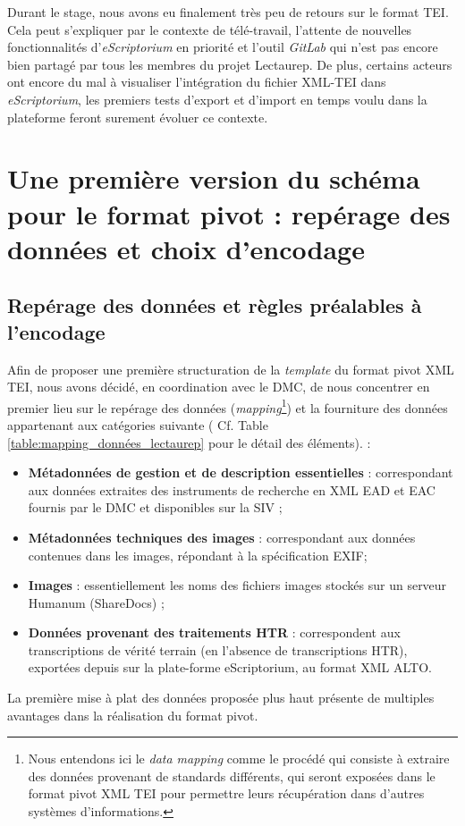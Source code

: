 Durant le stage, nous avons eu finalement très peu de retours sur le format TEI. Cela peut s'expliquer par le contexte de télé-travail, l'attente de nouvelles fonctionnalités d'\textit{eScriptorium} en priorité et l'outil \textit{GitLab} qui n'est pas encore bien partagé par tous les membres du projet Lectaurep. De plus, certains acteurs ont encore du mal à visualiser l'intégration du fichier XML-TEI dans \textit{eScriptorium}, les premiers tests d'export et d'import en temps voulu dans la plateforme feront surement évoluer ce contexte. 

\section{Une première version du schéma pour le format pivot : repérage des données et choix d'encodage}

\subsection{Repérage des données et règles préalables à l'encodage}

Afin de proposer une première structuration de la \textit{template} du format pivot XML TEI, nous avons décidé, en coordination avec le DMC, de nous concentrer en premier lieu sur le repérage des données (\textit{mapping}\footnote{Nous entendons ici le \textit{data mapping} comme le procédé qui consiste à extraire des données provenant de standards différents, qui seront exposées dans le format pivot XML TEI pour permettre leurs récupération dans d'autres systèmes d'informations.}) et la fourniture des données appartenant aux catégories suivante ( Cf. Table \ref{table:mapping_données_lectaurep} pour le détail des éléments). :  
\bigskip
\begin{itemize}
    \item \textbf{Métadonnées de gestion et de description essentielles} : correspondant aux données extraites des instruments de recherche en XML EAD et EAC fournis par le DMC et disponibles sur la SIV ;
    \item \textbf{Métadonnées techniques des images} : correspondant aux données contenues dans les images, répondant à la spécification EXIF;
    \item \textbf{Images} : essentiellement les noms des fichiers images stockés sur un serveur Humanum (ShareDocs) ;
    \item \textbf{Données provenant des traitements HTR} : correspondent aux transcriptions de vérité terrain (en l'absence de transcriptions HTR), exportées depuis sur la plate-forme eScriptorium, au format XML ALTO.
\end{itemize}
\bigskip
La première mise à plat des données proposée plus haut présente de multiples avantages dans la réalisation du format pivot.\\ 

